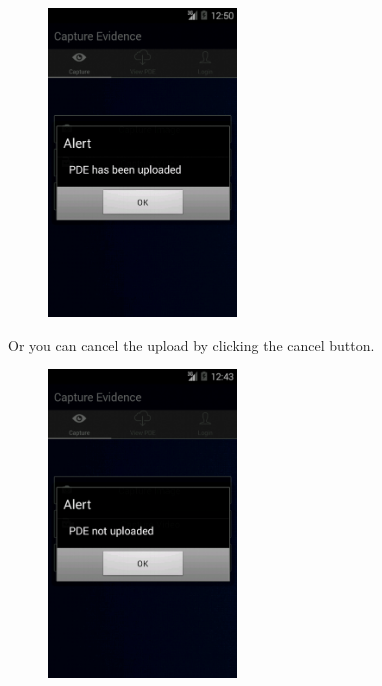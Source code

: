 \documentclass[a4paper,12pt]{article}
\begin{document}
\begin{figure}[H]
\begin{center}
\includegraphics[width=50mm,scale=0.5]{images/screenshots/uploadsuccess.png}
\end{center}
\end{figure}
Or you can cancel the upload by clicking the cancel button.
\begin{figure}[H]
\begin{center}
\includegraphics[width=50mm,scale=0.5]{images/screenshots/cancelcapture.png}
\end{center}
\end{figure}
\end{document}
